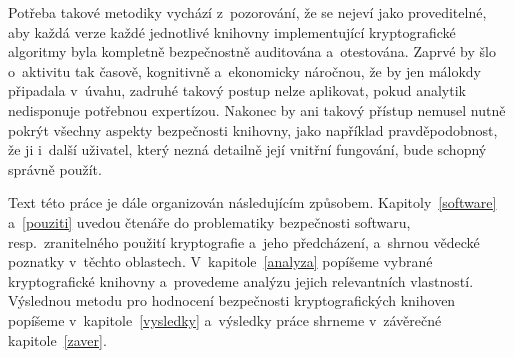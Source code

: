 Potřeba takové metodiky vychází z~pozorování, že se nejeví jako proveditelné, aby každá verze každé jednotlivé knihovny implementující kryptografické algoritmy byla kompletně bezpečnostně auditována a~otestována. Zaprvé by šlo o~aktivitu tak časově, kognitivně a~ekonomicky náročnou, že by jen málokdy připadala v~úvahu, zadruhé takový postup nelze aplikovat, pokud analytik nedisponuje potřebnou expertízou. Nakonec by ani takový přístup nemusel nutně pokrýt všechny aspekty bezpečnosti knihovny, jako například pravděpodobnost, že ji i~další uživatel, který nezná detailně její vnitřní fungování, bude schopný správně použít.

Text této práce je dále organizován následujícím způsobem. Kapitoly~\ref{software} a~\ref{pouziti} uvedou čtenáře do problematiky bezpečnosti softwaru, resp.\ zranitelného použití kryptografie a~jeho předcházení, a~shrnou vědecké poznatky v~těchto oblastech. V~kapitole~\ref{analyza} popíšeme vybrané kryptografické knihovny a~provedeme analýzu jejich relevantních vlastností. Výslednou metodu pro hodnocení bezpečnosti kryptografických knihoven popíšeme v~kapitole~\ref{vysledky} a~výsledky práce shrneme v~závěrečné kapitole~\ref{zaver}.
